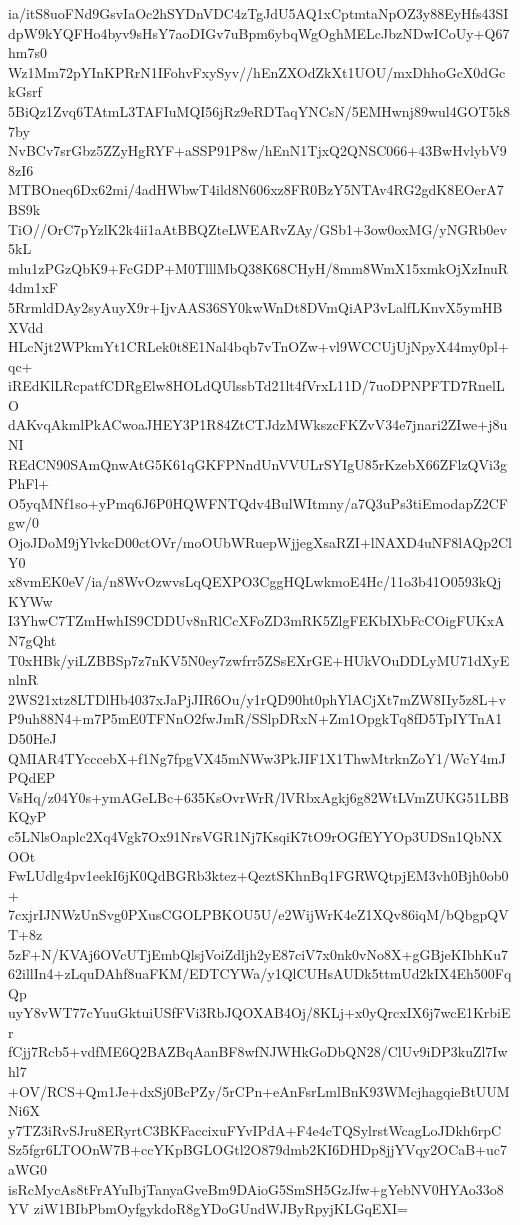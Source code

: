 ia/itS8uoFNd9GsvIaOc2hSYDnVDC4zTgJdU5AQ1xCptmtaNpOZ3y88EyHfs43SI
dpW9kYQFHo4byv9sHsY7aoDIGv7uBpm6ybqWgOghMELcJbzNDwICoUy+Q67hm7s0
Wz1Mm72pYInKPRrN1IFohvFxySyv//hEnZXOdZkXt1UOU/mxDhhoGcX0dGckGsrf
5BiQz1Zvq6TAtmL3TAFIuMQI56jRz9eRDTaqYNCsN/5EMHwnj89wul4GOT5k87by
NvBCv7srGbz5ZZyHgRYF+aSSP91P8w/hEnN1TjxQ2QNSC066+43BwHvlybV98zI6
MTBOneq6Dx62mi/4adHWbwT4ild8N606xz8FR0BzY5NTAv4RG2gdK8EOerA7BS9k
TiO//OrC7pYzlK2k4ii1aAtBBQZteLWEARvZAy/GSb1+3ow0oxMG/yNGRb0ev5kL
mlu1zPGzQbK9+FcGDP+M0TlllMbQ38K68CHyH/8mm8WmX15xmkOjXzInuR4dm1xF
5RrmldDAy2syAuyX9r+IjvAAS36SY0kwWnDt8DVmQiAP3vLalfLKnvX5ymHBXVdd
HLcNjt2WPkmYt1CRLek0t8E1Nal4bqb7vTnOZw+vl9WCCUjUjNpyX44my0pl+qc+
iREdKlLRcpatfCDRgElw8HOLdQUlssbTd21lt4fVrxL11D/7uoDPNPFTD7RnelLO
dAKvqAkmlPkACwoaJHEY3P1R84ZtCTJdzMWkszcFKZvV34e7jnari2ZIwe+j8uNI
REdCN90SAmQnwAtG5K61qGKFPNndUnVVULrSYIgU85rKzebX66ZFlzQVi3gPhFl+
O5yqMNf1so+yPmq6J6P0HQWFNTQdv4BulWItmny/a7Q3uPs3tiEmodapZ2CFgw/0
OjoJDoM9jYlvkcD00ctOVr/moOUbWRuepWjjegXsaRZI+lNAXD4uNF8lAQp2ClY0
x8vmEK0eV/ia/n8WvOzwvsLqQEXPO3CggHQLwkmoE4Hc/11o3b41O0593kQjKYWw
I3YhwC7TZmHwhIS9CDDUv8nRlCcXFoZD3mRK5ZlgFEKbIXbFcCOigFUKxAN7gQht
T0xHBk/yiLZBBSp7z7nKV5N0ey7zwfrr5ZSsEXrGE+HUkVOuDDLyMU71dXyEnlnR
2WS21xtz8LTDlHb4037xJaPjJIR6Ou/y1rQD90ht0phYlACjXt7mZW8IIy5z8L+v
P9uh88N4+m7P5mE0TFNnO2fwJmR/SSlpDRxN+Zm1OpgkTq8fD5TpIYTnA1D50HeJ
QMIAR4TYcccebX+f1Ng7fpgVX45mNWw3PkJIF1X1ThwMtrknZoY1/WcY4mJPQdEP
VsHq/z04Y0s+ymAGeLBc+635KsOvrWrR/lVRbxAgkj6g82WtLVmZUKG51LBBKQyP
c5LNlsOaplc2Xq4Vgk7Ox91NrsVGR1Nj7KsqiK7tO9rOGfEYYOp3UDSn1QbNXOOt
FwLUdlg4pv1eekI6jK0QdBGRb3ktez+QeztSKhnBq1FGRWQtpjEM3vh0Bjh0ob0+
7cxjrIJNWzUnSvg0PXusCGOLPBKOU5U/e2WijWrK4eZ1XQv86iqM/bQbgpQVT+8z
5zF+N/KVAj6OVcUTjEmbQlsjVoiZdljh2yE87ciV7x0nk0vNo8X+gGBjeKIbhKu7
62illIn4+zLquDAhf8uaFKM/EDTCYWa/y1QlCUHsAUDk5ttmUd2kIX4Eh500FqQp
uyY8vWT77cYuuGktuiUSfFVi3RbJQOXAB4Oj/8KLj+x0yQrcxIX6j7wcE1KrbiEr
fCjj7Rcb5+vdfME6Q2BAZBqAanBF8wfNJWHkGoDbQN28/ClUv9iDP3kuZl7Iwhl7
+OV/RCS+Qm1Je+dxSj0BcPZy/5rCPn+eAnFsrLmlBnK93WMcjhagqieBtUUMNi6X
y7TZ3iRvSJru8ERyrtC3BKFaccixuFYvIPdA+F4e4cTQSylrstWcagLoJDkh6rpC
Sz5fgr6LTOOnW7B+ccYKpBGLOGtl2O879dmb2KI6DHDp8jjYVqy2OCaB+uc7aWG0
isRcMycAs8tFrAYuIbjTanyaGveBm9DAioG5SmSH5GzJfw+gYebNV0HYAo33o8YV
ziW1BIbPbmOyfgykdoR8gYDoGUndWJByRpyjKLGqEXI=
